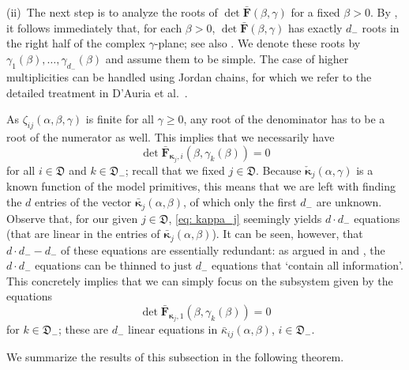 \documentclass[reqno,12pt]{amsart}
\newcommand{\bs}{\boldsymbol}
\newcommand{\defD}{{\mathfrak D}}
\newcommand{\defDmin}{{\mathfrak D}_-}
\begin{document}
{\medskip 

(ii)~The next step is to analyze the roots of $\det \bar{\bs F}(\beta,\gamma)$ for a fixed $\beta>0$. By \cite[Theorem 1]{IBM}, it follows immediately that, for each $\beta>0$, $\det \bar{\bs F}(\beta,\gamma)$ has exactly $d_-$ roots in the right half of the complex $\gamma$-plane; see also \cite[Lemma 3]{MKD}. We denote these roots by $\gamma_1(\beta),\dots,\gamma_{d_-}(\beta)$ and assume them to be simple. The case of higher multiplicities can be handled using Jordan chains, for which we refer to the detailed treatment in D’Auria et al.\ \cite{IV}.

As $\zeta_{ij}(\alpha, \beta, \gamma)$ is finite for all $\gamma\geqslant0$, any root of the denominator has to be a root of the numerator as well. This implies that we necessarily have
\begin{equation}\label{eq: kappa_j}
     \det\bar {\bs F}_{\bs\kappa_j, i}\left(\beta, \gamma_k(\beta)\right) = 0
\end{equation}
for all $i\in\defD $ and $k\in\defDmin $; recall that we fixed $j\in \defD $. 
Because $\check{\bs \kappa}_j(\alpha,\gamma)$ is a known function of the model primitives, this means that we are left with finding the $d$ entries of the vector $\bar{\bs \kappa}_j(\alpha,\beta)$, of which only the first $d_-$ are unknown.
Observe that, for our given $j\in\defD $, \eqref{eq: kappa_j} seemingly yields $d \cdot d_-$ equations (that are linear in the entries of $\bar{\bs \kappa}_j(\alpha,\beta)$). It can be seen, however, that $d \cdot d_- - d_-$ of these equations are essentially redundant: as argued in \cite[\S III.3]{MB} and \cite{MKD},
the $d \cdot d_-$ equations can be thinned to just $d_-$ equations that `contain all information'. 
This concretely implies that we can simply focus on the subsystem given by the equations 
\begin{equation}\label{eq: sys for kappa1}
    \det \bar {\bs F}_{\bs\kappa_j,1}\left(\beta, \gamma_k(\beta)\right) = 0
\end{equation} 
for $k\in\defDmin $; these are $d_-$ linear equations in $\bar{\kappa}_{ij}(\alpha,\beta)$, $i\in\defDmin $.

\medskip 

We summarize the results of this subsection in the following theorem. 

}
\end{document}

